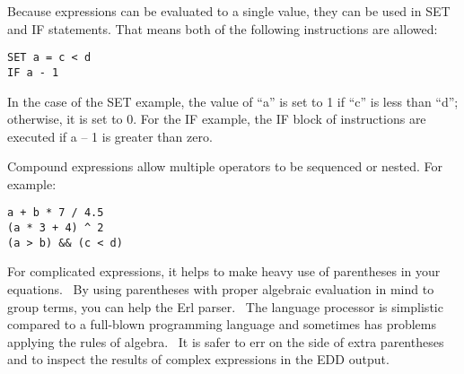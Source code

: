 Because expressions can be evaluated to a single value, they can be used in SET and IF statements. That means both of the following instructions are allowed:

\begin{lstlisting}
SET a = c < d
IF a - 1
\end{lstlisting}

In the case of the SET example, the value of ``a'' is set to 1 if ``c'' is less than ``d''; otherwise, it is set to 0. For the IF example, the IF block of instructions are executed if a -- 1 is greater than zero.

Compound expressions allow multiple operators to be sequenced or nested. For example:

\begin{lstlisting}
a + b * 7 / 4.5
(a * 3 + 4) ^ 2
(a > b) && (c < d)
\end{lstlisting}

For complicated expressions, it helps to make heavy use of parentheses in your equations.~ By using parentheses with proper algebraic evaluation in mind to group terms, you can help the Erl parser.~ The language processor is simplistic compared to a full-blown programming language and sometimes has problems applying the rules of algebra.~ It is safer to err on the side of extra parentheses and to inspect the results of complex expressions in the EDD output.
